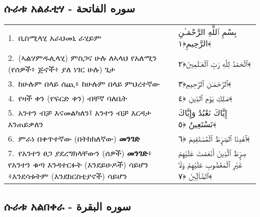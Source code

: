 \documentclass[11pt,a4paper,oneside]{article}%
\newcommand{\mytextarabic}[1]{\textarabic{ #1 \flushright}}
\begin{document}
\pagestyle{empty}
\tableofcontents{}
\cleardoublepage
{}
\pagestyle{plain}
\begin{center}\section{ሱራቱ አልፈቲሃ -  \textarabic{سوره  الفاتحة}}\end{center}
\begin{longtable}{%
  @{}
    p{}
  @{~~~}
    p{}
    @{}
}
1.\ ቢስሚላሂ አራህመኒ ራሂይም &  \mytextarabic{بِسْمِ ٱللَّهِ الرَّحْمَـٰنِ الرَّحِيمِ﴿١﴾}     \\
2.\ (ኣልሃምዱሊላሂ) ምስጋና ሁሉ ለኣላህ የአለሚን (የሰዎች፥ ጅኖች፥ ያለ ነገር ሁሉ) ጌታ & \mytextarabic{ٱلْحَمْدُ لِلَّهِ رَبِّ ٱلْعَـٰلَمِينَ﴿٢﴾} \\
3.\ ከሁሉም በላይ ሰጪ፥ ከሁሉም በላይ ምህረተኛው & \mytextarabic{ٱلرَّحْمَـٰنِ ٱلرَّحِيمِ﴿٣﴾}   \\
4.\ የዛች ቀን (የፍርድ ቀን) ብቸኛ ባለቤት &  \mytextarabic{ مَـٰلِكِ يَوْمِ ٱلدِّينِ ﴿٤﴾}   \\
5.\ አንተን ብቻ እናመልካለን፤ አንተን ብቻ እርዳታ እንጠይቃለን &  \mytextarabic{إِيَّاكَ نَعْبُدُ وَإِيَّاكَ نَسْتَعِينُ ﴿٥﴾}   \\
6.\ ምራነ በቀጥተኛው (በትክክለኛው) {\bf መንገድ} &  \mytextarabic{ٱهْدِنَا ٱلصِّرَٟطَ ٱلْمُسْتَقِيمَ ﴿٦﴾}  \\
7.\ የአንተን ፀጋ ያደረግክላቸውን (ሰዎች) {\bf መንገድ}፥ የአንተን ቁጣ እንዳተርፉት (እንደይሁዶች) ሳይሆን ፥እንደሳቱትም (እንደክርስቲያኖች) ሳይሆን &  \mytextarabic{ صِرَٟطَ ٱلَّذِينَ أَنْعَمْتَ عَلَيْهِمْ غَيْرِ ٱلْمَغْضُوبِ عَلَيْهِمْ وَلَا ٱلضَّآلِّينَ ﴿٧﴾} 

\end{longtable}
\clearpage
\begin{center}\section{ሱራቱ አልበቀራ -  \textarabic{سوره  البقرة} }\end{center}
\end{document}
